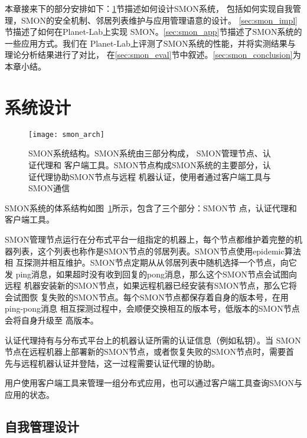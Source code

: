 
本章接来下的部分安排如下：\ref{sec:smon_design}节描述如何设计SMON系统，
包括如何实现自我管理，SMON的安全机制、邻居列表维护与应用管理语意的设计。
\ref{sec:smon_impl}节描述了如何在Planet-Lab上实现
SMON。\ref{sec:smon_app}节描述了SMON系统的一些应用方式。我们在
Planet-Lab上评测了SMON系统的性能，并将实测结果与理论分析结果进行了对比，
在\ref{sec:smon_eval}节中叙述。\ref{sec:smon_conclusion}为本章小结。


\section{系统设计}
\label{sec:smon_design}

\begin{figure}
  \centering
  \begin{minipage}{0.8\linewidth}
    \centering
    \texttt{[image: smon\_arch]}
    \caption[SMON系统结构]{SMON系统结构。SMON系统由三部分构成，
    SMON管理节点、认证代理和
    客户端工具。SMON节点构成SMON系统的主要部分，认证代理协助SMON节点与远程
    机器认证，使用者通过客户端工具与SMON通信}
    \label{fig:smon_arch}
  \end{minipage}
\end{figure}

SMON系统的体系结构如图~\ref{fig:smon_arch}所示，包含了三个部分：SMON节
点，认证代理和客户端工具。

SMON管理节点运行在分布式平台一组指定的机器上，每个节点都维护着完整的机
器列表，这个列表也称作是SMON节点的邻居列表。SMON节点使用epidemic算法相
互探测并相互维护。SMON节点定期从从邻居列表中随机选择一个节点，向它发
ping消息，如果超时没有收到回复的pong消息，那么这个SMON节点会试图向远程
机器安装新的SMON节点，如果远程机器已经安装有SMON节点，那么它将会试图恢
复失败的SMON节点。每个SMON节点都保存着自身的版本号，在用ping-pong消息
相互探测过程中，会顺便交换相互的版本号，低版本的SMON节点会将自身升级至
高版本。

认证代理持有与分布式平台上的机器认证所需的认证信息（例如私钥）。当
SMON节点在远程机器上部署新的SMON节点，或者恢复失败的SMON节点时，需要首
先与远程机器认证并登陆，这一过程需要认证代理的协助。

用户使用客户端工具来管理一组分布式应用，也可以通过客户端工具查询SMON与
应用的状态。

\subsection{自我管理设计}

